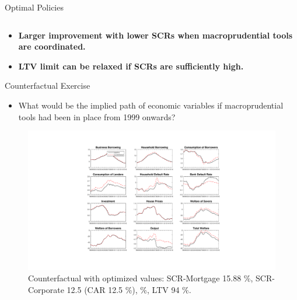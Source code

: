 \documentclass[8pt,aspectratio=169]{beamer}
\numberwithin{equation}{section}
\begin{document}
\begin{frame}{Optimal Policies}
\begin{table}[h]
\begin{tabular}{l|l}
\end{tabular}
\end{table}

\begin{itemize}
\item \textbf{Larger improvement with lower SCRs when macroprudential tools are coordinated.} 
\item \textbf{LTV limit can be relaxed if SCRs are sufficiently high. }
\end{itemize}

\end{frame}



\begin{frame}{Counterfactual Exercise}

\begin{itemize}
\item What would be the implied path of economic variables if macroprudential tools had been in place from 1999 onwards? 
\end{itemize}

\begin{figure}[H]
\centering
\caption{Counterfactual with optimized values: SCR-Mortgage 15.88 \%, SCR-Corporate 12.5 (CAR 12.5 \%), \%, LTV 94 \%.}
\includegraphics[scale=0.25]{counterfactuals2.pdf}
\end{figure}
\end{frame}
\end{document}

